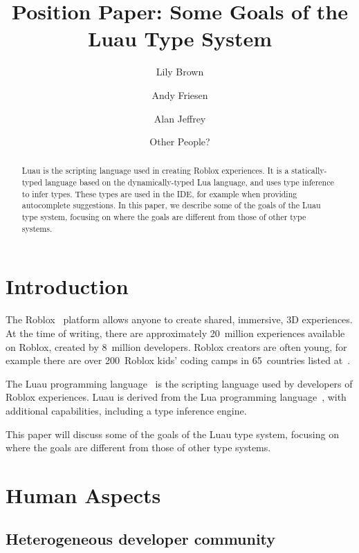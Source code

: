 \documentclass[acmsmall]{acmart}
\begin{document}
\title{Position Paper: Some Goals of the Luau Type System}

\author{Lily Brown}
\author{Andy Friesen}
\author{Alan Jeffrey}
\author{Other People?}

\begin{abstract}
  Luau is the scripting language used in creating Roblox experiences.
  It is a statically-typed language based on the dynamically-typed Lua language,
  and uses type inference to infer types. These types are used in the
  IDE, for example when providing autocomplete suggestions. In this
  paper, we describe some of the goals of the Luau type system,
  focusing on where the goals are different from those of other type systems.
\end{abstract}

\maketitle

\section{Introduction}

The Roblox~\cite{Roblox} platform allows anyone to create shared,
immersive, 3D experiences.  At the time of writing, there are
approximately 20~million experiences available on Roblox, created
by 8~million developers.  Roblox creators are often young, for
example there are over 200~Roblox kids' coding camps in 65~countries
listed at~\cite{AllEducators}.

The Luau programming language~\cite{Luau} is the scripting language
used by developers of Roblox experiences. Luau is derived from the Lua
programming language~\cite{Lua}, with additional capabilities,
including a type inference engine.

This paper will discuss some of the goals of the Luau type system,
focusing on where the goals are different from those of other type systems.

\section{Human Aspects}
\subsection{Heterogeneous developer community}
\end{document}
